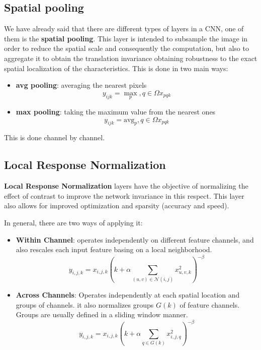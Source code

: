 \subsection{Spatial pooling}
We have already said that there are different types of layers in a CNN, one of them is 
the \textbf{spatial pooling}. This layer is intended to subsample the image in order 
to reduce the spatial scale and consequently the computation, but also to aggregate 
it to obtain the translation invariance obtaining robustness to the exact spatial 
localization of the characteristics. This is done in two main ways: 
\begin{itemize}
    \item \textbf{avg pooling}: averaging the nearest 
    pixels
    $$y_{ijk} =\max \limits_p,q\in \Omega x_{pqk}$$
    \item \textbf{max pooling}: taking the maximum value from the nearest ones
    $$y_{ijk} =\text{avg}_p,q\in \Omega x_{pqk}$$
\end{itemize}

This is done channel by channel.
\subsection{Local Response Normalization}
\textbf{Local Response Normalization} layers have the objective of normalizing the 
effect of contrast to improve the network invariance in this respect. This layer 
also allows for improved optimization and sparsity (accuracy and speed).

In general, there are two ways of applying it:
\begin{itemize}
    \item \textbf{Within Channel}: operates independently on different feature channels, and also rescales each input feature basing on a local neighborhood.
    \begin{equation}
        y_{i, j, k} = x_{i, j, k} \left(k + \alpha \sum_{(u, v) \in \mathcal{N}(i, j)} x_{u, v, k}^2 \right)^{-\beta}
    \end{equation}
    \item \textbf{Across Channels}:  Operates independently at each spatial location and groups of channels. it also normalizes groups $G(k)$ of feature channels. Groups are usually defined in a sliding window manner.
    \begin{equation}
        y_{i, j, k} = x_{i, j, k} \left(k + \alpha \sum_{q \in G(k)} x_{i, j, q}^2 \right)^{-\beta}
    \end{equation}
\end{itemize}

